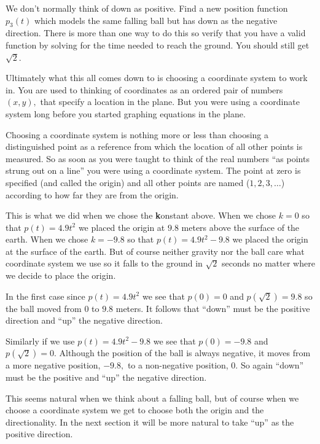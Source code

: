 \begin{embeddedproblem}{}
We don't normally think of down as positive. Find a new position
function $p_3(t)$ which models the same falling ball but has down as
the negative direction. There is more than one way to do this so
verify that you have a valid function by solving for the time needed
to reach the ground. You should still get $\sqrt{2}.$
\end{embeddedproblem}

Ultimately what this all comes down to is choosing a coordinate system
to work in. You are used to thinking of coordinates as an ordered pair
of numbers $(x,y),$ that specify a location in the plane. But you were
using a coordinate system long before you started graphing equations
in the plane. 

Choosing a coordinate system is nothing more or less than choosing a
distinguished point as a reference from which the location of all
other points is measured. So as soon as you were taught to think of
the real numbers ``as points strung out on a line'' you were using a
coordinate system. The point at zero is specified (and called the
origin) and all other points are named ($1, 2, 3, \ldots$) according
to how far they are from the origin. 

This is what we did when we chose the {\bf k}onstant above. When we
chose $k=0$ so that $p(t)=4.9t^2$ we placed the origin at $9.8$ meters
above the surface of the earth. When we chose $k=-9.8$ so that
$p(t)=4.9t^2-9.8$ we placed the origin at the surface of the
earth. But of course neither gravity nor the ball care what coordinate
system we use so it falls to the ground in $\sqrt{2}$ seconds no
matter where we decide to place the origin.

In the first case since $p(t)=4.9t^2$ we see that $p(0) = 0$ and
$p(\sqrt{2}) = 9.8$ so the ball moved from $0$ to $9.8$ meters. It
follows that ``down'' must be the positive direction and ``up'' the
negative direction.

Similarly if we use $p(t)=4.9t^2-9.8$ we see that $p(0) = -9.8$ and
$p(\sqrt{2}) = 0.$ Although the position of the ball is always
negative, it moves from a more negative position, $-9.8,$ to a
non-negative position, $0.$ So again ``down'' must be the positive and
``up'' the negative direction.

This seems natural when we think about a falling ball, but of course
when we choose a coordinate system we get to choose both the origin
and  the directionality. In the next section it will be more natural
to take ``up'' as the positive direction.

